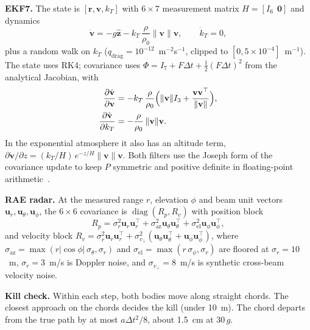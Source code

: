 \documentclass[conference,letterpaper]{IEEEtran}
\newcommand{\vect}[1]{\mathbf{#1}}
\begin{document}
\textbf{EKF7.} The state is $[\vect r, \vect v, k_T]$ with $6\times7$ measurement matrix $H = [I_6\;\,\vect 0]$ and dynamics
\begin{equation*}
\dot{\vect v} = -g\hat{\vect z} - k_T\,\frac{\rho}{\rho_0}\lVert\vect v\rVert\vect v, \qquad \dot k_T = 0,
\end{equation*}
plus a random walk on $k_T$ ($q_{\mathrm{drag}} = 10^{-12}$~m$^{-2}$s$^{-1}$, clipped to $[0, 5\times10^{-4}]$~m$^{-1}$).
The state uses RK4; covariance uses $\Phi = I_7 + F\Delta t + \tfrac12(F\Delta t)^2$ from the analytical Jacobian, with
\begin{align*}
\frac{\partial\dot{\vect v}}{\partial\vect v} &= -k_T\,\frac{\rho}{\rho_0}\Bigl(\lVert\vect v\rVert I_3 + \frac{\vect v\vect v^\top}{\lVert\vect v\rVert}\Bigr),\\
\frac{\partial\dot{\vect v}}{\partial k_T} &= -\frac{\rho}{\rho_0}\,\lVert\vect v\rVert\vect v .
\end{align*}
In the exponential atmosphere it also has an altitude term, $\partial\dot{\vect v}/\partial z = (k_T/H)\,e^{-z/H}\lVert\vect v\rVert\vect v$.
Both filters use the Joseph form of the covariance update to keep $P$ symmetric and positive definite in floating-point arithmetic~\cite{barshalom2001}.

\textbf{RAE radar.} At the measured range $r$, elevation $\phi$ and beam unit vectors $\vect u_r, \vect u_\theta, \vect u_\phi$, the $6\times6$ covariance is $\operatorname{diag}(R_p, R_v)$ with position block
\begin{equation*}
R_p = \sigma_r^2\vect u_r\vect u_r^\top + \sigma_{\mathrm{az}}^2\vect u_\theta\vect u_\theta^\top + \sigma_{\mathrm{el}}^2\vect u_\phi\vect u_\phi^\top ,
\end{equation*}
and velocity block $R_v = \sigma_{\dot r}^2\vect u_r\vect u_r^\top + \sigma_{v_\perp}^2(\vect u_\theta\vect u_\theta^\top + \vect u_\phi\vect u_\phi^\top)$, where $\sigma_{\mathrm{az}} = \max(r\lvert\cos\phi\rvert\,\sigma_\theta, \sigma_r)$ and $\sigma_{\mathrm{el}} = \max(r\,\sigma_\phi, \sigma_r)$ are floored at $\sigma_r = 10$~m, $\sigma_{\dot r} = 3$~m/s is Doppler noise, and $\sigma_{v_\perp} = 8$~m/s is synthetic cross-beam velocity noise.

\textbf{Kill check.} Within each step, both bodies move along straight chords.
The closest approach on the chords decides the kill (under 10~m).
The chord departs from the true path by at most $a\Delta t^2/8$, about 1.5~cm at 30\,$g$.
\end{document}
